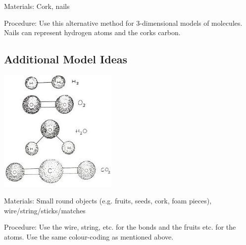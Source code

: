 \begin{multicols}{2}
\begin{description*}
\item[Materials:]{Cork, nails}
\item[Procedure:]{Use this alternative method for 3-dimensional models of molecules. Nails can represent hydrogen atoms and the corks carbon.}
\end{description*}

\vfill
\columnbreak

\subsection{Additional Model Ideas}

\begin{center}
\includegraphics[width=0.43\textwidth]{./img/source/3d-models.jpg}
\end{center}

\begin{description*}
\item[Materials:]{Small round objects (e.g. fruits, seeds, cork, foam pieces), wire/string/sticks/matches}
\item[Procedure:]{Use the wire, string, etc. for the bonds and the fruits etc. for the atoms. Use the same colour-coding as mentioned above.}
\end{description*}


\end{multicols}
